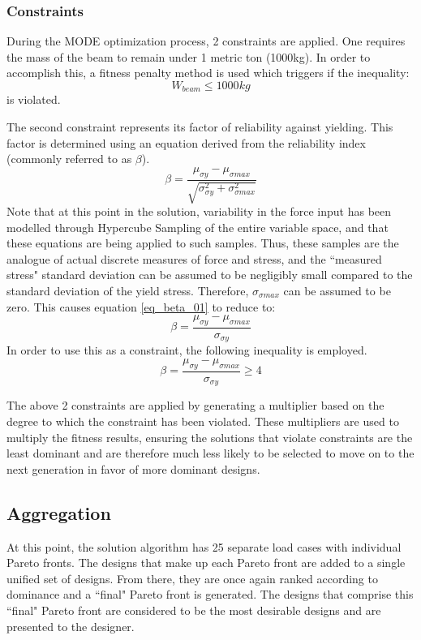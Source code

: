 \subsubsection{Constraints}
During the MODE optimization process, 2 constraints are applied. One requires the mass of the beam to remain under 1 metric ton (1000kg). In order to accomplish this, a fitness penalty method is used which triggers if the inequality:
$$
W_{beam} \leq 1000kg
$$
is violated. 

The second constraint represents its factor of reliability against yielding. This factor is determined using an equation derived from the reliability index (commonly referred to as $\beta$).
\begin{equation}\label{eq_beta_01}
\beta = \frac{\mu_{\sigma y} - \mu_{\sigma max}}{\sqrt{\sigma_{\sigma y}^2 + \sigma_{\sigma max}^2}}
\end{equation}
Note that at this point in the solution, variability in the force input has been modelled through Hypercube Sampling of the entire variable space, and that these equations are being applied to such samples. Thus, these samples are the analogue of actual discrete measures of force and stress, and the ``measured stress" standard deviation can be assumed to be negligibly small compared to the standard deviation of the yield stress. Therefore, $\sigma_{\sigma max}$ can be assumed to be zero. This causes equation \ref{eq_beta_01} to reduce to: 
\begin{equation}
\beta = \frac{\mu_{\sigma y} - \mu_{\sigma max}}{\sigma_{\sigma y}}
\end{equation}
In order to use this as a constraint, the following inequality is employed. 
\begin{equation}
\beta = \frac{\mu_{\sigma y} - \mu_{\sigma max}}{\sigma_{\sigma y}} \geq 4
\end{equation}

The above 2 constraints are applied by generating a multiplier based on the degree to which the constraint has been violated. These multipliers are used to multiply the fitness results, ensuring the solutions that violate constraints are the least dominant and are therefore much less likely to be selected to move on to the next generation in favor of more dominant designs. 

\subsection{Aggregation}
At this point, the solution algorithm has 25 separate load cases with individual Pareto fronts. The designs that make up each Pareto front are added to a single unified set of designs. From there, they are once again ranked according to dominance and a ``final" Pareto front is generated. The designs that comprise this ``final" Pareto front are considered to be the most desirable designs and are presented to the designer. 
